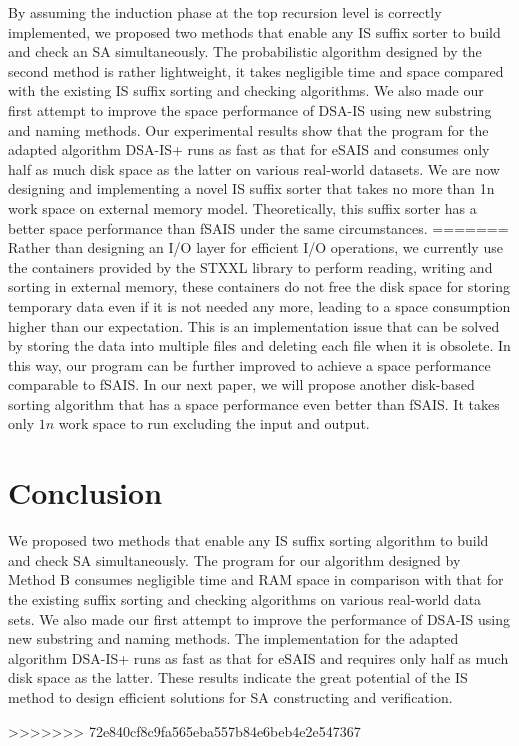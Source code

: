 \documentclass[10pt,journal,compsoc]{IEEEtran}
\begin{document}
By assuming the induction phase at the top recursion level is correctly implemented, we proposed two methods that enable any IS suffix sorter to build and check an SA simultaneously. The probabilistic algorithm designed by the second method is rather lightweight, it takes negligible time and space compared with the existing IS suffix sorting and checking algorithms. We also made our first attempt to improve the space performance of DSA-IS using new substring and naming methods. Our experimental results show that the program for the adapted algorithm DSA-IS+ runs as fast as that for eSAIS and consumes only half as much disk space as the latter on various real-world datasets. We are now designing and implementing a novel IS suffix sorter that takes no more than 1n work space on external memory model. Theoretically, this suffix sorter has a better space performance than fSAIS under the same circumstances. 
=======
Rather than designing an I/O layer for efficient I/O operations, we currently use the containers provided by the STXXL library to perform reading, writing and sorting in external memory, these containers do not free the disk space for storing temporary data even if it is not needed any more, leading to a space consumption higher than our expectation. This is an implementation issue that can be solved by storing the data into multiple files and deleting each file when it is obsolete. In this way, our program can be further improved to achieve a space performance comparable to fSAIS. In our next paper, we will propose another disk-based sorting algorithm that has a space performance even better than fSAIS. It takes only $1n$ work space to run excluding the input and output.

\section{Conclusion} \label{sec:conclusion}

We proposed two methods that enable any IS suffix sorting algorithm to build and check SA simultaneously. The program for our algorithm designed by Method B consumes negligible time and RAM space in comparison with that for the existing suffix sorting and checking algorithms on various real-world data sets. We also made our first attempt to improve the performance of DSA-IS using new substring and naming methods. The implementation for the adapted algorithm DSA-IS+ runs as fast as that for eSAIS and requires only half as much disk space as the latter. These results indicate the great potential of the IS method to design efficient solutions for SA constructing and verification. 

>>>>>>> 72e840cf8c9fa565eba557b84e6beb4e2e547367



\end{document}

